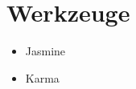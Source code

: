 \documentclass[qualitaetssicherung.tex]{subfiles}
\begin{document}
\section{Werkzeuge}\label{werkzeuge}
\begin{itemize}
	\item
	Jasmine
	\item
	Karma
\end{itemize}
		
\end{document}
